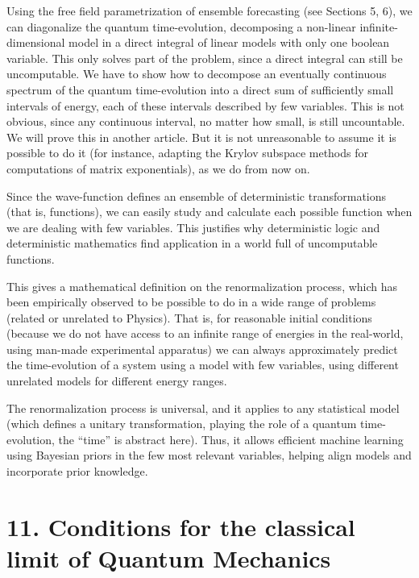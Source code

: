 \documentclass[11pt]{book}
\begin{document}
Using the free field parametrization of ensemble
forecasting\cite{wu2021theory} (see Sections
5, 6), we can diagonalize the quantum time-evolution, decomposing a
non-linear infinite-dimensional model in a direct integral of linear
models with only one boolean variable. This only solves part of the
problem, since a direct integral can still be uncomputable. We have to
show how to decompose an eventually continuous spectrum of the quantum
time-evolution into a direct sum of sufficiently small intervals of
energy, each of these intervals described by few variables. This is not
obvious, since any continuous interval, no matter how small, is still
uncountable. We will prove this in another article. But it is not
unreasonable to assume it is possible to do it (for instance, adapting
the Krylov subspace methods for computations of matrix
exponentials\cite{hashimoto_shift-invert_2019}\cite{hashimoto_shift-invert_2016}), as we do from now on.

Since the wave-function defines an ensemble of deterministic
transformations (that is, functions), we can easily study and calculate
each possible function when we are dealing with few variables. This
justifies why deterministic logic and deterministic mathematics find
application in a world full of uncomputable functions.

This gives a mathematical definition on the renormalization process,
which has been empirically observed to be possible to do in a wide range
of problems (related or unrelated to
Physics)\cite{Machta_2013}\cite{B_ny_2015}. That
is, for reasonable initial conditions (because we do not have access to
an infinite range of energies in the real-world, using man-made
experimental apparatus) we can always approximately predict the
time-evolution of a system using a model with few variables, using
different unrelated models for different energy ranges.

The renormalization process is universal, and it applies to any
statistical model (which defines a unitary transformation, playing the
role of a quantum time-evolution, the ``time'' is abstract here). Thus,
it allows efficient machine learning using Bayesian priors in the few
most relevant variables, helping align models and incorporate prior
knowledge.

\hypertarget{conditions-for-the-classical-limit-of-quantum-mechanics}{%
\section{11. Conditions for the classical limit of Quantum
Mechanics}\label{conditions-for-the-classical-limit-of-quantum-mechanics}}
\end{document}
